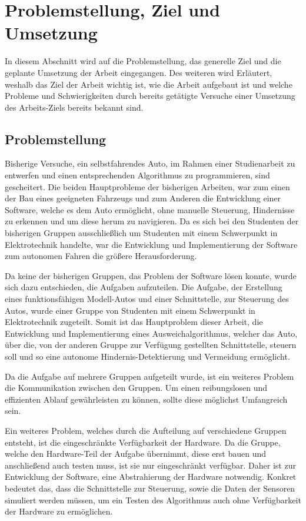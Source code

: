 \section{Problemstellung, Ziel und Umsetzung}
In diesem Abschnitt wird auf die Problemstellung, das generelle Ziel und die geplante Umsetzung der Arbeit eingegangen.
Des weiteren wird Erläutert, weshalb das Ziel der Arbeit wichtig ist, wie die Arbeit aufgebaut ist und welche Probleme und Schwierigkeiten durch bereits getätigte Versuche einer Umsetzung des Arbeits-Ziels bereits bekannt sind.

\subsection{Problemstellung}
Bisherige Versuche, ein selbstfahrendes Auto, im Rahmen einer Studienarbeit zu entwerfen und einen entsprechenden Algorithmus zu programmieren, sind gescheitert. Die beiden Hauptprobleme der bisherigen Arbeiten, war zum einen der Bau eines geeigneten Fahrzeugs und zum Anderen die Entwicklung einer Software, welche es dem Auto ermöglicht, ohne manuelle Steuerung, Hindernisse zu erkennen und um diese herum zu navigieren. Da es sich bei den Studenten der bisherigen Gruppen ausschließlich um Studenten mit einem Schwerpunkt in Elektrotechnik handelte, war die Entwicklung und Implementierung der Software zum autonomen Fahren die größere Herausforderung.

Da keine der bisherigen Gruppen, das Problem der Software lösen konnte, wurde sich dazu entschieden, die Aufgaben aufzuteilen. Die Aufgabe, der Erstellung eines funktionsfähigen Modell-Autos und einer Schnittstelle, zur Steuerung des Autos, wurde einer Gruppe von Studenten mit einem Schwerpunkt in Elektrotechnik zugeteilt. Somit ist das Hauptproblem dieser Arbeit, die Entwicklung und Implementierung eines Ausweichalgorithmus, welcher das Auto, über die, von der anderen Gruppe zur Verfügung gestellten Schnittstelle, steuern soll und so eine autonome Hindernis-Detektierung und Vermeidung ermöglicht.

Da die Aufgabe auf mehrere Gruppen aufgeteilt wurde, ist ein weiteres Problem die Kommunikation zwischen den Gruppen. Um einen reibungslosen und effizienten Ablauf gewährleisten zu können, sollte diese möglichst Umfangreich sein.

Ein weiteres Problem, welches durch die Aufteilung auf verschiedene Gruppen entsteht, ist die eingeschränkte Verfügbarkeit der Hardware. Da die Gruppe, welche den Hardware-Teil der Aufgabe übernimmt, diese erst bauen und anschließend auch testen muss, ist sie nur eingeschränkt verfügbar. Daher ist zur Entwicklung der Software, eine Abstrahierung der Hardware notwendig. Konkret bedeutet das, dass die Schnittstelle zur Steuerung, sowie die Daten der Sensoren simuliert werden müssen, um ein Testen des Algorithmus auch ohne Verfügbarkeit der Hardware zu ermöglichen.

